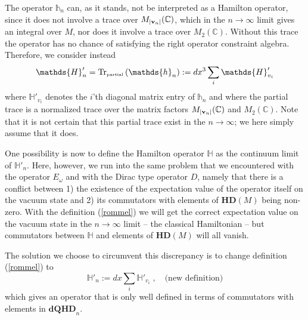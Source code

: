 \documentclass[12pt]{article}
\def\d{\delta}
\def\oo{\omega}
\begin{document}







The operator $\mathds{h}_n$ can, as it stands, not be interpreted as a Hamilton operator, since it does not involve a trace over $M_{\vert {\bf v}_n \vert}(\mathbb{C})$, which in the $n\rightarrow\infty $ limit gives an integral over $M$, nor does it involve a trace over $M_2(\mathbb{C})$. Without this trace the operator has no chance of satisfying the right operator constraint algebra. Therefore, we consider instead
\begin{equation}
\mathds{H}'_n = \mbox{Tr}_{\mbox{\tiny partial}} \left(\mathds{h}_n\right) := dx^3\sum_i \mathds{H}'_{v_i}
\label{rommel}
\end{equation}
where $\mathds{H}'_{v_i}$ denotes the $i$'th diagonal matrix entry of $\mathds{h}_n$ and where the partial trace is a normalized trace over the matrix factors $M_{\vert {\bf v}_n \vert}(\mathbb{C})$ and $M_2(\mathbb{C})$. Note that it is not certain that this partial trace exist in the $n\rightarrow\infty$; we here simply assume that it does. 

One possibility is now to define the Hamilton operator $\mathds{H}$ as the continuum limit of $\mathds{H}'_n $. Here, however, we run into the same problem that we encountered with the operator $E_{\oo}$ and with the Dirac type operator $D$, namely that there is a conflict between 1) the existence of the expectation value of the operator itself on the vacuum state and 2) its commutators with elements of $\mathbf{HD}(M)$ being non-zero. With the definition (\ref{rommel}) we will get the correct expectation value on the vacuum state in the $n\rightarrow\infty$ limit -- the classical Hamiltonian -- but commutators between $\mathds{H}$ and elements of $\mathbf{HD}(M)$ will all vanish.

The solution we choose to circumvent this discrepancy is to change definition (\ref{rommel}) to
\begin{equation}
\mathds{H}'_n := dx \sum_i \mathds{H}'_{v_i}\;,\quad\mbox{(new definition)}
 \label{rommel22}
\end{equation}
which gives an operator that is only well defined in terms of commutators with elements in $\mathbf{dQHD}_n$. 
\end{document}
